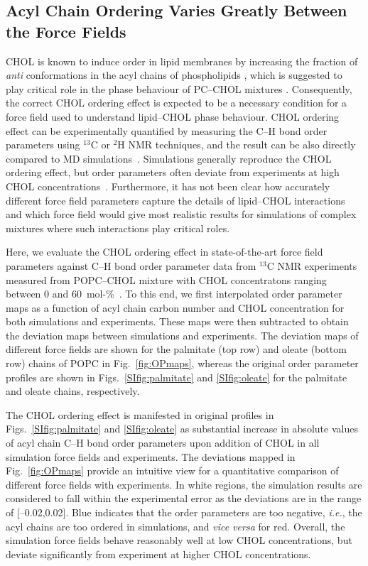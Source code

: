 \documentclass[journal=jctcce]{achemso}
\begin{document}
\subsection{Acyl Chain Ordering Varies Greatly Between the Force Fields}

CHOL is known to induce order in lipid membranes by increasing the fraction of \textit{anti} conformations in the acyl chains of phospholipids \cite{ferreira13}, which is suggested to play critical role in the phase behaviour of PC--CHOL mixtures \cite{ipsen87}. Consequently, the correct CHOL ordering effect is expected to be a necessary condition for a force field used to understand lipid--CHOL phase behaviour. CHOL ordering effect can be experimentally quantified by measuring the C--H bond order parameters using $^{13}$C or $^{2}$H NMR techniques, and the result can be also directly compared to MD simulations~\cite{ollila16}. Simulations generally reproduce the CHOL ordering effect, but order parameters often deviate from experiments at high CHOL concentrations~\cite{ferreira13,madej15}. Furthermore, it has not been clear how accurately different force field parameters capture the details of lipid--CHOL interactions and which force field would give most realistic results for simulations of complex mixtures where such interactions play critical roles. 

Here, we evaluate the CHOL ordering effect in state-of-the-art force field parameters against C--H bond order parameter data from $^{13}$C NMR experiments measured from POPC--CHOL mixture with CHOL concentratons ranging between 0 and 60~mol-\%~\cite{ferreira13}. To this end, we first interpolated order parameter maps as a function of acyl chain carbon number and CHOL concentration for both simulations and experiments. These maps were then subtracted to obtain the deviation maps between simulations and experiments. The deviation maps of different force fields are shown for the palmitate (top row) and oleate (bottom row) chains of POPC in Fig.~\ref{fig:OPmaps}, whereas the original order parameter profiles are shown in Figs.~\ref{SIfig:palmitate} and \ref{SIfig:oleate} for the palmitate and oleate chains, respectively.

The CHOL ordering effect is manifested in original profiles in Figs.~\ref{SIfig:palmitate} and \ref{SIfig:oleate} as substantial increase in absolute values of acyl chain C--H bond order parameters upon addition of CHOL in all simulation force fields and experiments. The deviations mapped in Fig.~\ref{fig:OPmaps} provide an intuitive view for a quantitative comparison of different force fields with experiments. In white regions, the simulation results are considered to fall within the experimental error as the deviations are in the range of [--0.02,0.02]. Blue indicates that the order parameters are too negative, \textit{i.e.}, the acyl chains are too ordered in simulations, and \textit{vice versa} for red. Overall, the simulation force fields behave reasonably well at low CHOL concentrations, but deviate significantly from experiment at higher CHOL concentrations. 
\end{document}
